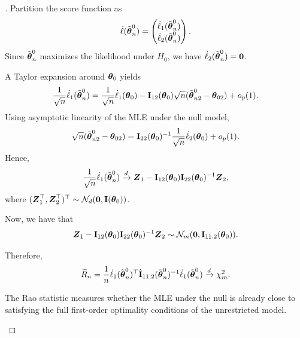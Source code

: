 \begin{proof}[]
Partition the score function as
\begin{equation*}
\dot{\ell}(\tilde{\boldsymbol{\theta}}_n^0)
=
\begin{pmatrix}
\dot{\ell}_1(\tilde{\boldsymbol{\theta}}_n^0) \\
\dot{\ell}_2(\tilde{\boldsymbol{\theta}}_n^0)
\end{pmatrix}.
\end{equation*}
Since $\tilde{\boldsymbol{\theta}}_n^0$ maximizes the likelihood under $H_0$, we have
$\dot{\ell}_2(\tilde{\boldsymbol{\theta}}_n^0)=\boldsymbol{0}$.

A Taylor expansion around $\boldsymbol{\theta}_0$ yields
\begin{equation*}
\frac{1}{\sqrt{n}}\dot{\ell}_1(\tilde{\boldsymbol{\theta}}_n^0)
=
\frac{1}{\sqrt{n}}\dot{\ell}_1(\boldsymbol{\theta}_0)
-
\mathbf{I}_{12}(\boldsymbol{\theta}_0)\sqrt{n}(\tilde{\boldsymbol{\theta}}_{n2}^0-\boldsymbol{\theta}_{02})
+ o_p(1).
\end{equation*}
Using asymptotic linearity of the MLE under the null model,
\begin{equation*}
\sqrt{n}(\tilde{\boldsymbol{\theta}}_{n2}^0-\boldsymbol{\theta}_{02})
=
\mathbf{I}_{22}(\boldsymbol{\theta}_0)^{-1}
\frac{1}{\sqrt{n}}\dot{\ell}_2(\boldsymbol{\theta}_0)
+ o_p(1).
\end{equation*}
Hence,
\begin{equation*}
\frac{1}{\sqrt{n}}\dot{\ell}_1(\tilde{\boldsymbol{\theta}}_n^0)
\xrightarrow{d}
\boldsymbol{Z}_1 - \mathbf{I}_{12}(\boldsymbol{\theta}_0)\mathbf{I}_{22}(\boldsymbol{\theta}_0)^{-1}\boldsymbol{Z}_2,
\end{equation*}
where $(\boldsymbol{Z}_1^\top,\boldsymbol{Z}_2^\top)^\top \sim \mathcal{N}_d(\boldsymbol{0},\mathbf{I}(\boldsymbol{\theta}_0))$.

Now, we have that
\begin{equation*}
\boldsymbol{Z}_1 - \mathbf{I}_{12}(\boldsymbol{\theta}_0)\mathbf{I}_{22}(\boldsymbol{\theta}_0)^{-1}\boldsymbol{Z}_2
\sim
\mathcal{N}_m(\boldsymbol{0},\mathbf{I}_{11.2}(\boldsymbol{\theta}_0)).
\end{equation*}

Therefore,
\begin{equation*}
\widetilde{R}_n
=
\frac{1}{n}
\dot{\ell}_1(\tilde{\boldsymbol{\theta}}_n^0)^\top
\hat{\mathbf{I}}_{11.2}(\tilde{\boldsymbol{\theta}}_n^0)^{-1}
\dot{\ell}_1(\tilde{\boldsymbol{\theta}}_n^0)
\xrightarrow{d}
\chi^2_m .
\end{equation*}

\begin{remark}
The Rao statistic measures whether the MLE under the null is already close to satisfying the full
first-order optimality conditions of the unrestricted model.
\end{remark}


\end{proof}
